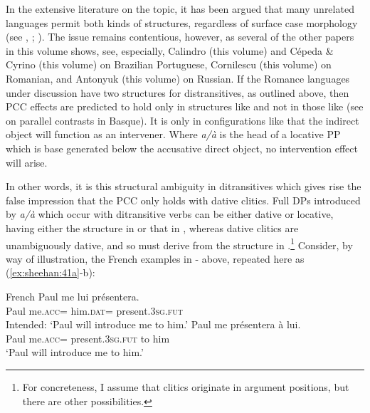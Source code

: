 \documentclass[output=paper,colorlinks,citecolor=brown,nonflat]{./langscibook}
\begin{document}
In the extensive literature on the topic, it has been argued that many unrelated languages permit both kinds of structures, regardless of surface case morphology (see \citealt{Marantz1993, Pesetsky1995, Cuervo2003, Anagnostopoulou2003, Pylkkänen2002}, \citeyear{Pylkkänen2008}; \citealt{MiyagawaTsujioka2004, Bruening2010DOC, HarleyMiyagawa2017}). The issue remains contentious, however, as several of the other papers in this volume shows, see, especially, Calindro (this volume) and Cépeda \& Cyrino (this volume) on Brazilian Portuguese, Cornilescu (this volume) on Romanian, and Antonyuk (this volume) on Russian. If the Romance languages under discussion have two structures for distransitives, as outlined above, then PCC effects are predicted to hold only in structures like  and not in those like  (see \citealt{Rezac2008} on parallel contrasts in Basque). It is only in configurations like  that the indirect object will function as an intervener. Where \textit{a/à} is the head of a locative PP which is base generated below the accusative direct object, no intervention effect will arise. 

In other words, it is this structural ambiguity in ditransitives which gives rise the false impression that the PCC only holds with dative clitics. Full DPs introduced by \textit{a/à} which occur with ditransitive verbs can be either dative or locative, having either the structure in  or that in , whereas dative clitics are unambiguously dative, and so must derive from the structure in .\footnote{For concreteness, I assume that clitics originate in argument positions, but there are other possibilities.} Consider, by way of illustration, the French examples in - above, repeated here as (\ref{ex:sheehan:41a}-b): 

\ea%
    \label{ex:sheehan:41}
    French \citep[173-174]{Kayne1975}
    \ea\label{ex:sheehan:41a}
    \gll    *Paul   me       lui       présentera.\\
            Paul   me.\textsc{acc}=   him.\textsc{dat=} present.\textsc{3sg.fut}\\
    \glt    Intended: ‘Paul will introduce me to him.’
    \ex\label{ex:sheehan:41b}
    \gll    Paul   me     présentera     à lui.\\
            Paul  me.\textsc{acc}=  present.\textsc{3sg.fut}   to him\\
    \glt    ‘Paul will introduce me to him.’
    \z
\z
\end{document}
